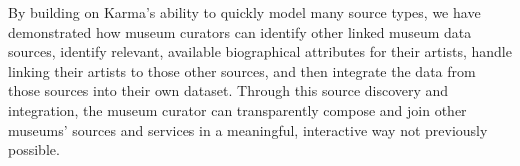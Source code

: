By building on Karma's ability to quickly model many source types, we have demonstrated how museum curators can identify other linked museum data sources, identify relevant, available biographical attributes for their artists, handle linking their artists to those other sources, and then integrate the data from those sources into their own dataset. 
Through this source discovery and integration, the museum curator can transparently compose and join other museums' sources and services in a meaningful, interactive way not previously possible.